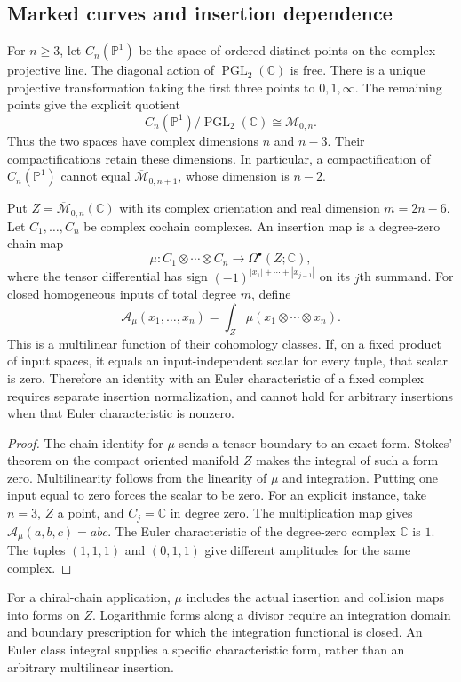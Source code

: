 \subsection{Marked curves and insertion dependence}

For $n\geq3$, let $C_n(\mathbb P^1)$ be the space of ordered distinct points on the complex projective line.
The diagonal action of $\operatorname{PGL}_2(\mathbb C)$ is free.
There is a unique projective transformation taking the first three points to $0,1,\infty$.
The remaining points give the explicit quotient
\[
 C_n(\mathbb P^1)/\operatorname{PGL}_2(\mathbb C)
 \cong\mathcal M_{0,n}.
\]
Thus the two spaces have complex dimensions $n$ and $n-3$.
Their compactifications retain these dimensions.
In particular, a compactification of $C_n(\mathbb P^1)$ cannot equal $\overline{\mathcal M}_{0,n+1}$, whose dimension is $n-2$.

\begin{proposition}
\label{thm:genus0-amplitude-bar}
Put $Z=\overline{\mathcal M}_{0,n}(\mathbb C)$ with its complex orientation and real dimension $m=2n-6$.
Let $C_1,\ldots,C_n$ be complex cochain complexes.
An insertion map is a degree-zero chain map
\[
 \mu:C_1\otimes\cdots\otimes C_n\longrightarrow
 \Omega^\bullet(Z;\mathbb C),
\]
where the tensor differential has sign $(-1)^{|x_1|+\cdots+|x_{j-1}|}$ on its $j$th summand.
For closed homogeneous inputs of total degree $m$, define
\[
 \mathcal A_\mu(x_1,\ldots,x_n)=\int_Z\mu(x_1\otimes\cdots\otimes x_n).
\]
This is a multilinear function of their cohomology classes.
If, on a fixed product of input spaces, it equals an input-independent scalar for every tuple, that scalar is zero.
Therefore an identity with an Euler characteristic of a fixed complex requires separate insertion normalization, and cannot hold for arbitrary insertions when that Euler characteristic is nonzero.
\end{proposition}

\begin{proof}
The chain identity for $\mu$ sends a tensor boundary to an exact form.
Stokes' theorem on the compact oriented manifold $Z$ makes the integral of such a form zero.
Multilinearity follows from the linearity of $\mu$ and integration.
Putting one input equal to zero forces the scalar to be zero.
For an explicit instance, take $n=3$, $Z$ a point, and $C_j=\mathbb C$ in degree zero.
The multiplication map gives $\mathcal A_\mu(a,b,c)=abc$.
The Euler characteristic of the degree-zero complex $\mathbb C$ is $1$.
The tuples $(1,1,1)$ and $(0,1,1)$ give different amplitudes for the same complex.
\end{proof}

For a chiral-chain application, $\mu$ includes the actual insertion and collision maps into forms on $Z$.
Logarithmic forms along a divisor require an integration domain and boundary prescription for which the integration functional is closed.
An Euler class integral supplies a specific characteristic form, rather than an arbitrary multilinear insertion.

